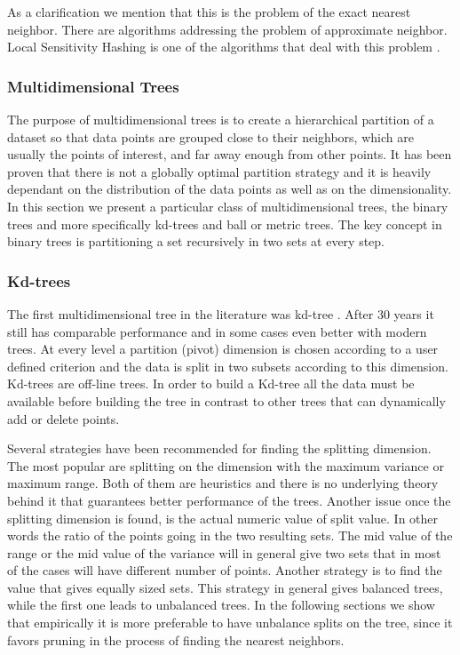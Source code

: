 \documentclass[12pt,letterpaper,doublespaced,ETD,dvips,proposal]{gtthesis}
\begin{document}
\begin{Body}
As a clarification we mention that this is the problem of the exact
nearest neighbor. There are algorithms addressing the problem of
approximate neighbor. Local Sensitivity Hashing is one of the
algorithms that deal with this problem \cite{datar2004lsh}.

\subsubsection{Multidimensional Trees}
\label{Multidimensional_Trees}

The purpose of multidimensional trees is to create a hierarchical
partition of a dataset so that data points are grouped close to
their neighbors, which are usually the points of interest, and far
away enough from other points. It has been proven that there is not
a globally optimal partition strategy \cite{gyorfi2002dft} 
and it is heavily dependant on the distribution of the data points 
as well as on the dimensionality. In this section we present a particular
 class of multidimensional
trees, the binary trees and more specifically kd-trees and ball or
metric trees. The key concept in binary trees is partitioning a set
recursively in two sets at every step.

\subsubsection{Kd-trees}
\label{Kd_trees}

The first multidimensional tree in the literature was kd-tree \cite{bentley1975bst}. After
30 years it still has comparable performance and in some cases even
better with modern trees. At every level a partition (pivot)
dimension is chosen according to a user defined criterion and the
data is split in two subsets according to this dimension. Kd-trees
are off-line trees. In order to build a Kd-tree all the data must be
available before building the tree in contrast to other trees that
can dynamically add or delete points.

Several strategies have been recommended for finding the splitting
dimension. The most popular are splitting on the dimension with the
maximum variance or maximum range. Both of them are heuristics and
there is no underlying theory behind it that guarantees better
performance of the trees. Another issue once the splitting dimension
is found, is the actual numeric value of split value. In other words
the ratio of the points going in the two resulting sets. The mid
value of the range or the mid value of the variance will in general
give two sets that in most of the cases will have different number
of points. Another strategy is to find the value that gives equally
sized sets. This strategy in general gives balanced trees, while the
first one leads to unbalanced trees. In the following sections we
show that empirically it is more preferable to have unbalance splits
on the tree, since it favors pruning in the process of finding the
nearest neighbors.


\end{Body}
\end{document}
